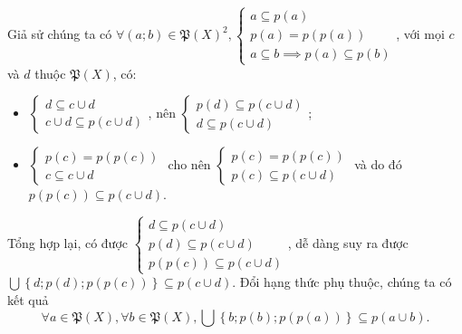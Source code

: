 \solution

Giả sử chúng ta có $\forall (a; b) \in \mathfrak{P}(X)^2, \begin{cases}
   a \subseteq p(a) \\
   p(a) = p(p(a)) \\
   a \subseteq b \implies p(a) \subseteq p(b)
\end{cases}$, với mọi $c$ và $d$ thuộc $\mathfrak{P}(X)$, có:
\begin{itemize}
   \item $\begin{cases}
      d \subseteq c \cup d \\
      c \cup d \subseteq p(c \cup d)
   \end{cases}$, nên $\begin{cases}
      p(d) \subseteq p(c \cup d) \\
      d \subseteq p(c \cup d)
   \end{cases}$;
   \item $\begin{cases}
      p(c) = p(p(c)) \\
      c \subseteq c \cup d
   \end{cases}$ cho nên $\begin{cases}
      p(c) = p(p(c)) \\
      p(c) \subseteq p(c \cup d)
   \end{cases}$ và do đó $p(p(c)) \subseteq p(c \cup d)$.
\end{itemize}
Tổng hợp lại, có được $\begin{cases}
   d \subseteq p(c \cup d) \\
   p(d) \subseteq p(c \cup d) \\
   p(p(c)) \subseteq p(c \cup d)
\end{cases}$, dễ dàng suy ra được $\bigcup\left\{d; p(d); p(p(c))\right\} \subseteq p(c \cup d)$. Đổi hạng thức phụ thuộc, chúng ta có kết quả \begin{equation*}
   \forall a \in \mathfrak{P}(X), \forall b \in \mathfrak{P}(X), \bigcup\left\{b; p(b); p(p(a))\right\} \subseteq p(a \cup b).
\end{equation*}

